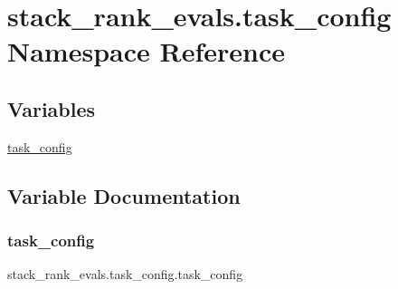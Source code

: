 \hypertarget{namespacestack__rank__evals_1_1task__config}{}\section{stack\+\_\+rank\+\_\+evals.\+task\+\_\+config Namespace Reference}
\label{namespacestack__rank__evals_1_1task__config}
\subsection*{Variables}
\begin{DoxyCompactItemize}
\item 
\hyperlink{namespacestack__rank__evals_1_1task__config_a9b5899c098ee8ba7dbf35ea12de0e248}{task\+\_\+config}
\end{DoxyCompactItemize}


\subsection{Variable Documentation}
\mbox{\label{namespacestack__rank__evals_1_1task__config_a9b5899c098ee8ba7dbf35ea12de0e248}} 
\subsubsection{\texorpdfstring{task\+\_\+config}{task\_config}}
{\footnotesize\ttfamily stack\+\_\+rank\+\_\+evals.\+task\+\_\+config.\+task\+\_\+config}

